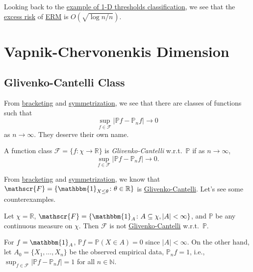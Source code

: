 \begin{remark}
	Looking back to the \hyperref[eg:1D-classification-thresholds]{example of 1-D thresholds classification}, we see that the \hyperref[def:excess-risk]{excess risk} of \hyperref[prb:ERM]{ERM} is \(O(\sqrt{\log n / n} )\).
\end{remark}

\section{Vapnik-Chervonenkis Dimension}
\subsection{Glivenko-Cantelli Class}
From \hyperref[prop:bracketing]{bracketing} and \hyperref[prop:symmetrization]{symmetrization}, we see that there are classes of functions such that
\[
	\sup _{f\in \mathscr{F} } \left\vert \mathbb{P} f - \mathbb{P} _n f \right\vert \to 0
\]
as \(n \to \infty \). They deserve their own name.

\begin{definition}\label{def:Glivenko-Cantelli}
	A function class \(\mathscr{F} = \{ f\colon \chi \to \mathbb{R} \} \) is \emph{Glivenko-Cantelli} w.r.t.\ \(\mathbb{P} \) if as \(n \to \infty \),
	\[
		\sup _{f\in \mathscr{F} } \left\vert \mathbb{P} f - \mathbb{P} _n f \right\vert \to 0.
	\]
\end{definition}

From \hyperref[prop:bracketing]{bracketing} and \hyperref[prop:symmetrization]{symmetrization}, we know that \(\mathscr{F} = \{ \mathbbm{1}_{X \leq \theta } \colon \theta \in \mathbb{R} \} \) is \hyperref[def:Glivenko-Cantelli]{Glivenko-Cantelli}. Let's see some counterexamples.

\begin{eg}
	Let \(\chi = \mathbb{R} \), \(\mathscr{F} = \{ \mathbbm{1}_{A} \colon A \subseteq \chi, \vert A \vert < \infty \} \), and \(\mathbb{P} \) be any continuous measure on \(\chi \). Then \(\mathscr{F} \) is not \hyperref[def:Glivenko-Cantelli]{Glivenko-Cantelli} w.r.t.\ \(\mathbb{P} \).
\end{eg}
\begin{explanation}
	For \(f = \mathbbm{1}_{A} \), \(\mathbb{P} f = \mathbb{P} (X\in A) = 0\) since \(\vert A \vert < \infty \). On the other hand, let \(A_0 = \{ X_1, \dots , X_n \} \) be the observed empirical data, \(\mathbb{P} _n f = 1\), i.e., \(\sup _{f\in \mathscr{F} } \vert \mathbb{P} f - \mathbb{P} _n f \vert = 1\) for all \(n\in \mathbb{N} \).
\end{explanation}


